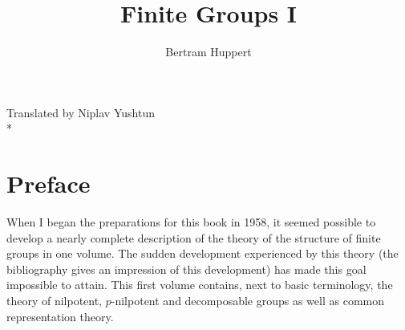 \documentclass{article}
\title{Finite Groups I}
\author{Bertram Huppert}
\begin{document}
\maketitle

\begin{center}
{\small{Translated by Niplav Yushtun}} \\*
\end{center}

\thispagestyle{empty}
\clearpage
\setcounter{page}{1}

\section{Preface}

When I began the preparations for this book in 1958, it seemed possible to
develop a nearly complete description of the theory of the structure of
finite groups in one volume. The sudden development experienced by this
theory (the bibliography gives an impression of this development) has
made this goal impossible to attain. This first volume contains, next to
basic terminology, the theory of nilpotent, $p$-nilpotent and decomposable
groups as well as common representation theory.

\cite{dummy}

\thispagestyle{empty}
\clearpage



\end{document}
